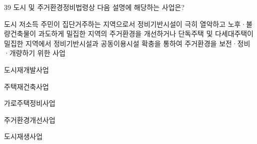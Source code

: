 \begin{question}{39}
도시 및 주거환경정비법령상 다음 설명에 해당하는 사업은?
\begin{framedtext}
도시 저소득 주민이 집단거주하는 지역으로서 정비기반시설이 극히 열악하고 노후·불량건축물이 과도하게 밀집한 지역의 주거환경을 개선하거나 단독주택 및 다세대주택이 밀집한 지역에서 정비기반시설과 공동이용시설 확충을 통하여 주거환경을 보전·정비·개량하기 위한 사업
\end{framedtext}
\begin{choices}
  \item 도시재개발사업
  \item 주택재건축사업
  \item 가로주택정비사업
  \item 주거환경개선사업
  \item 도시재생사업
\end{choices}
\end{question}
